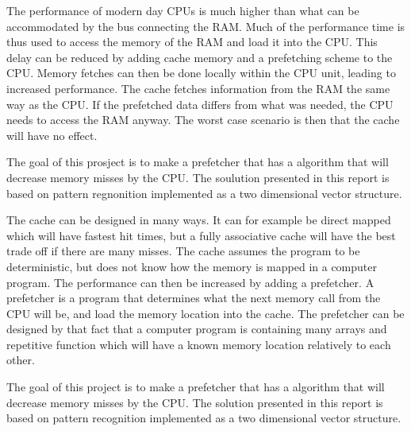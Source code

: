 The performance of modern day CPUs is much higher than what can be accommodated by the bus connecting the RAM. Much of the performance time is thus used to access the memory of the RAM and load it into the CPU. This delay can be reduced by adding cache memory and a prefetching scheme to the CPU. Memory fetches can then be done locally within the CPU unit, leading to increased performance. The cache fetches information from the RAM the same way as the CPU. If the prefetched data differs from what was needed, the CPU needs to access the RAM anyway. The worst case scenario is then that the cache will have no effect.


The goal of this prosject is to make a prefetcher that has a algorithm that will decrease memory misses by the CPU. The soulution presented in this report is based on pattern regnonition implemented as a two dimensional vector structure.

The cache can be designed in many ways. It can for example be direct mapped which will have fastest hit times, but a fully associative cache will have the best trade off if there are many misses. The cache assumes the program to be deterministic, but does not know how the memory is mapped in a computer program. The performance can then be increased by adding a prefetcher. A prefetcher is a program that determines what the next memory call from the CPU will be, and load the memory location into the cache. The prefetcher can be designed by that fact that a computer program is containing many arrays and repetitive function which will have a known memory location relatively to each other.

The goal of this project is to make a prefetcher that has a algorithm that will decrease memory misses by the CPU. The solution presented in this report is based on pattern recognition implemented as a two dimensional vector structure.

